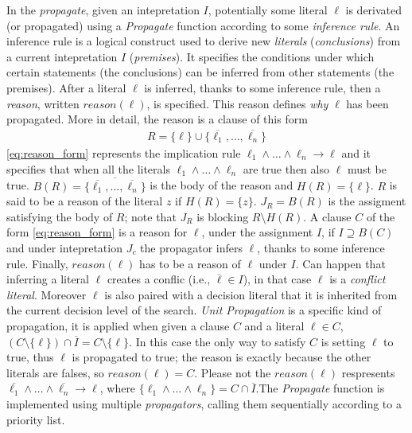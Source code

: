 In the \textit{propagate}, given an intepretation $I$,
potentially some literal $\ell$ is derivated 
(or propagated) using a \textit{Propagate} function according to some \textit{inference rule}.
An inference rule is a logical construct used  
to derive new \textit{literals} (\textit{conclusions}) 
from a current intepretation $I$ (\textit{premises}). 
It specifies the conditions under which certain statements (the conclusions) 
can be inferred from other statements (the premises).
After a literal $\ell$ is inferred, thanks to some inference rule, then a \textit{reason}, written $\mathit{reason}(\ell)$, 
is specified. This reason defines \textit{why} $\ell$ has been propagated.
More in detail, the reason is a clause of this form 
\begin{align}
    \label{eq:reason_form}
    R = \{ \ell \} \cup \{\overline{\ell_1},\hdots, \overline{\ell_n}\}
\end{align}
\eqref{eq:reason_form} represents the implication 
rule $\ell_1 \land \hdots \land \ell_n \rightarrow \ell$ and it specifies 
that when all the literals $\ell_1 \land \hdots \land \ell_n$ are true then also 
$\ell$ must be true. $B(R) = \overline{\{\overline{\ell_1},\hdots, \overline{\ell_n}\}}$
is the body of the reason and $H(R) = \{\ell\}$.
$R$ is said to be a reason of the literal $z$ if $H(R) = \{z\}$.
$J_R= B(R)$ is the assigment satisfying the body of $R$; note that $J_R$ is blocking $R \setminus H(R)$.
A clause $C$ of the form \eqref{eq:reason_form} is a reason for $\ell$, under the assignment $I$, 
if $I \supseteq B(C)$ and under intepretation $J_c$ the propagator 
infers  $\ell$, thanks to some inference rule.
Finally, $\mathit{reason}(\ell)$ has to be a reason of $\ell$ under $I$.
Can happen that inferring a literal $\ell$ creates a conflic (i.e., $\overline{\ell} \in I$),
in that case $\ell$ is a \textit{conflict literal}.
Moreover $\ell$ is also paired with a decision literal 
that it is inherited from the current decision level of the search.
\textit{Unit Propagation} is a specific kind of propagation, it is applied when given a clause 
$C$ and a literal $\ell \in C $, $(C \setminus \{\ell\}) \cap \overline{I} = C \setminus \{\ell\}$.
In this case the only way to satisfy $C$ is setting $\ell$ to true, thus $\ell$
is propagated to true; the reason is exactly because the other literals are falses, so 
$reason(\ell) = C$.
Please not the $reason(\ell)$ respresents $\overline{\ell_1} \land \hdots \land \overline{\ell_n} \rightarrow \ell$, where 
$\{\ell_1 \land \hdots \land \ell_n\} = C \cap \overline{I}$.The \textit{Propagate} function is implemented using multiple \textit{propagators},
calling them sequentially according to a priority list.

